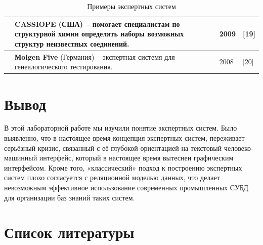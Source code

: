 \documentclass[14pt,a4paper,report]{report}
\begin{document}
\begin{table}[h!]
\begin{tabular}{ | P{2cm} | P{13cm} | P{1cm} | P{0.5cm} | }
& \textbf{CASSIOPE} (США) -- помогает специалистам по структурной химии определять наборы возможных структур неизвестных соединений. & 2009 & [19] \\ \hline

& \textbf{Мolgen Five} (Германия) -- экспертная системя для генеалогического тестирования. & 2008 & [20] \\ \hline

\end{tabular}
\egroup
\caption{Примеры экспертных систем}
\label{table:2}
\end{table}

\section{Вывод}

В этой лабораторной работе мы изучили понятие экспертных систем. Было выявленно, что в настоящее время концепция экспертных систем, переживает серьёзный кризис, связанный с её глубокой ориентацией на текстовый человеко-машинный интерфейс, который в настоящее время вытеснен графическим интерфейсом. Кроме того, «классический» подход к построению экспертных систем плохо согласуется с реляционной моделью данных, что делает невозможным эффективное использование современных промышленных СУБД для организации баз знаний таких систем.

\clearpage

\section{Список литературы}
\end{document}
